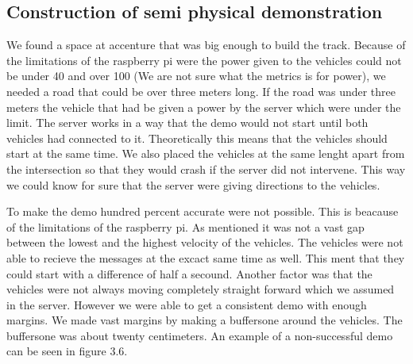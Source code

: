 \subsection{Construction of semi physical demonstration}

We found a space at accenture that was big enough to build the track. Because of the limitations of the raspberry pi were the power given to the vehicles could not be under 40 and over 100 (We are not sure what the metrics is for power), we needed a road that could be over three meters long. If the road was under three meters the vehicle that had be given a power by the server which were under the limit. The server works in a way that the demo would not start until both vehicles had connected to it. Theoretically this means that the vehicles should start at the same time. We also placed the vehicles at the same lenght apart from the intersection so that they would crash if the server did not intervene. This way we could know for sure that the server were giving directions to the vehicles. 

To make the demo hundred percent accurate were not possible. This is beacause of the limitations of the raspberry pi. As mentioned it was not a vast gap between the lowest and the highest velocity of the vehicles. The vehicles were not able to recieve the messages at the excact same time as well. This ment that they could start with a difference of half a secound. Another factor was that the vehicles were not always moving completely straight forward which we assumed in the server. However we were able to get a consistent demo with enough margins. We made  vast margins by making a buffersone around the vehicles. The buffersone was about twenty centimeters. An example of a non-successful demo can be seen in figure 3.6.

